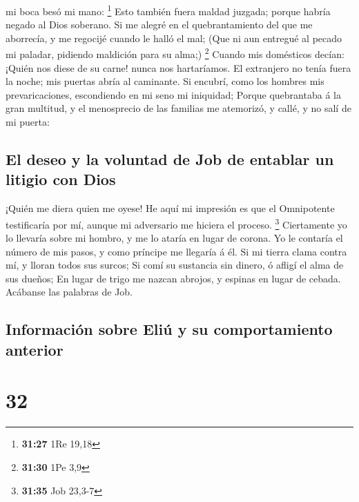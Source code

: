 mi boca besó mi mano: \footnote{\textbf{31:27} 1Re 19,18} 
Esto también fuera maldad juzgada; porque habría negado al Dios
soberano.  Si me alegré en el quebrantamiento del que me
aborrecía, y me regocijé cuando le halló el mal;  (Que ni
aun entregué al pecado mi paladar, pidiendo maldición para su alma;)
\footnote{\textbf{31:30} 1Pe 3,9}  Cuando mis domésticos
decían: ¡Quién nos diese de su carne! nunca nos hartaríamos.
 El extranjero no tenía fuera la noche; mis puertas abría
al caminante.  Si encubrí, como los hombres mis
prevaricaciones, escondiendo en mi seno mi iniquidad; 
Porque quebrantaba á la gran multitud, y el menosprecio de las familias
me atemorizó, y callé, y no salí de mi puerta:

\hypertarget{el-deseo-y-la-voluntad-de-job-de-entablar-un-litigio-con-dios}{%
\subsection{El deseo y la voluntad de Job de entablar un litigio con
Dios}\label{el-deseo-y-la-voluntad-de-job-de-entablar-un-litigio-con-dios}}

 ¡Quién me diera quien me oyese! He aquí mi impresión es
que el Omnipotente testificaría por mí, aunque mi adversario me hiciera
el proceso. \footnote{\textbf{31:35} Job 23,3-7} 
Ciertamente yo lo llevaría sobre mi hombro, y me lo ataría en lugar de
corona.  Yo le contaría el número de mis pasos, y como
príncipe me llegaría á él.  Si mi tierra clama contra mí, y
lloran todos sus surcos;  Si comí su sustancia sin dinero,
ó afligí el alma de sus dueños;  En lugar de trigo me
nazcan abrojos, y espinas en lugar de cebada. Acábanse las palabras de
Job.

\hypertarget{informaciuxf3n-sobre-eliuxfa-y-su-comportamiento-anterior}{%
\subsection{Información sobre Eliú y su comportamiento
anterior}\label{informaciuxf3n-sobre-eliuxfa-y-su-comportamiento-anterior}}

\hypertarget{section-31}{%
\section{32}\label{section-31}}

